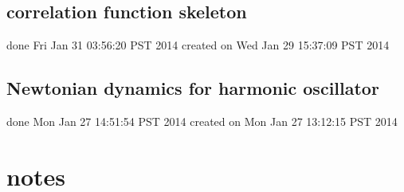 \documentclass{article}
\begin{document}
\subsection{correlation function skeleton}
done Fri Jan 31 03:56:20 PST 2014
created on Wed Jan 29 15:37:09 PST 2014
\label{sub:correlation_function_skeleton}
\subsection{Newtonian dynamics for harmonic oscillator}
done Mon Jan 27 14:51:54 PST 2014
created on Mon Jan 27 13:12:15 PST 2014
\label{sub:newtonian_dynamics_for_harmonic_oscillator}

\section{notes}
\end{document}
